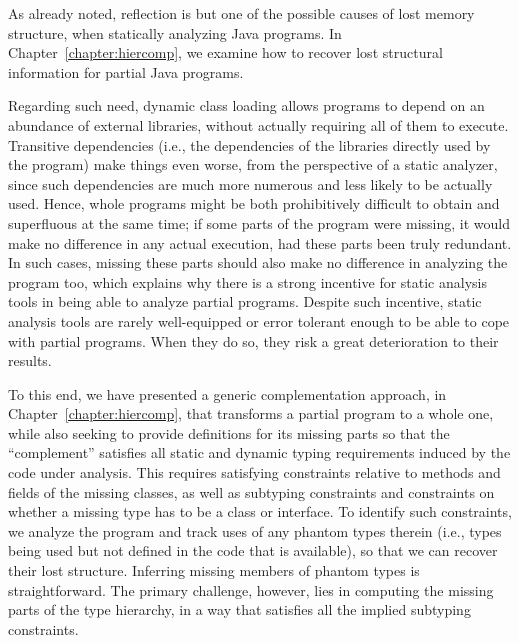 As already noted, reflection is but one of the possible causes of lost
memory structure, when statically analyzing Java programs. In
Chapter~\ref{chapter:hiercomp}, we examine how to recover lost
structural information for partial Java programs.


Regarding such need, dynamic class loading allows programs to depend
on an abundance of external libraries, without actually requiring all
of them to execute. Transitive dependencies (i.e., the dependencies of
the libraries directly used by the program) make things even worse,
from the perspective of a static analyzer, since such dependencies are
much more numerous and less likely to be actually used. Hence, whole
programs might be both prohibitively difficult to obtain and
superfluous at the same time; if some parts of the program were
missing, it would make no difference in any actual execution, had
these parts been truly redundant. In such cases, missing these parts
should also make no difference in analyzing the program too, which
explains why there is a strong incentive for static analysis tools in
being able to analyze partial programs. Despite such incentive, static
analysis tools are rarely well-equipped or error tolerant enough to be
able to cope with partial programs. When they do so, they risk a great
deterioration to their results.

To this end, we have presented a generic complementation approach, in
Chapter~\ref{chapter:hiercomp}, that transforms a partial program to a
whole one, while also seeking to provide definitions for its missing
parts so that the ``complement'' satisfies all static and dynamic
typing requirements induced by the code under analysis. This requires
satisfying constraints relative to methods and fields of the missing
classes, as well as subtyping constraints and constraints on whether a
missing type has to be a class or interface.
%
To identify such constraints, we analyze the program and track uses
of any phantom types therein (i.e., types being used but not defined
in the code that is available), so that we can recover their
lost structure. Inferring missing members of phantom types is
straightforward. The primary challenge, however, lies in computing the
missing parts of the type hierarchy, in a way that satisfies all the
implied subtyping constraints.

